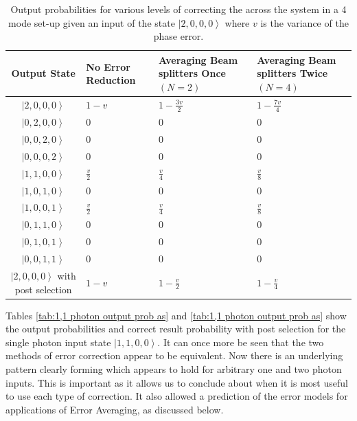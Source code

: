 \documentclass[aps,pra,twocolumn,superscriptaddress,numerical,floatfix]{revtex4-1}
\begin{document}
\begin{widetext}
\begin{table}
{\begin{centering}
	\begin{tabular}{|c|>{\centering}p{4cm}|>{\centering}p{4cm}|>{\centering}p{4cm}|}
		\hline 
		Output State & No Error Reduction & Averaging Beam splitters Once $\left(N=2\right)$ & Averaging Beam splitters Twice $\left(N=4\right)$\tabularnewline
		\hline 
		\hline 
		$\left|2,0,0,0\right\rangle $ & $1-v$ & $1-\frac{3v}{2}$ & $1-\frac{7v}{4}$\tabularnewline
		\hline 
		$\left|0,2,0,0\right\rangle $ & $0$ & $0$ & $0$\tabularnewline
		\hline 
		$\left|0,0,2,0\right\rangle $ & $0$ & $0$ & $0$\tabularnewline
		\hline 
		$\left|0,0,0,2\right\rangle $ & $0$ & $0$ & $0$\tabularnewline
		\hline 
		$\left|1,1,0,0\right\rangle $ & $\frac{v}{2}$ & $\frac{v}{4}$ & $\frac{v}{8}$\tabularnewline
		\hline 
		$\left|1,0,1,0\right\rangle $ & $0$ & $0$ & $0$\tabularnewline
		\hline 
		$\left|1,0,0,1\right\rangle $ & $\frac{v}{2}$ & $\frac{v}{4}$ & $\frac{v}{8}$\tabularnewline
		\hline 
		$\left|0,1,1,0\right\rangle $ & $0$ & $0$ & $0$\tabularnewline
		\hline 
		$\left|0,1,0,1\right\rangle $ & $0$ & $0$ & $0$\tabularnewline
		\hline 
		$\left|0,0,1,1\right\rangle $ & $0$ & $0$ & $0$\tabularnewline
		\hline 
		$\left|2,0,0,0\right\rangle $ with post selection & $1-v$ & $1-\frac{v}{2}$ & $1-\frac{v}{4}$\tabularnewline
		\hline 
	\end{tabular}
	\par\end{centering}

}

\caption[Output probabilities for various levels of correcting the across the
system in a 4 mode set-up given an input of the state $\left|2,0,0,0\right\rangle $.]{Output probabilities for various levels of correcting the across
the system in a 4 mode set-up given an input of the state $\left|2,0,0,0\right\rangle $
where $v$ is the variance of the phase error. \label{tab:2 photon output prob as}}
\end{table}


Tables \ref{tab:1,1 photon output prob as} and \ref{tab:1,1 photon output prob as}
show the output probabilities and correct result probability with
post selection for the single photon input state $\left|1,1,0,0\right\rangle $.
It can once more be seen that the two methods of error correction
appear to be equivalent. Now there is an underlying pattern clearly
forming which appears to hold for arbitrary one and two photon inputs.
This is important as it allows us to conclude about when it is most
useful to use each type of correction. It also allowed a prediction
of the error models for applications of Error Averaging, as discussed
below.


\end{widetext}
\end{document}
